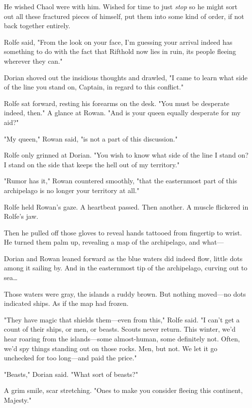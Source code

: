 He wished Chaol were with him. Wished for time to just 
\emph{stop} so he might sort out all these fractured pieces of himself, put them into some kind of order, if not back together entirely.

Rolfe said, "From the look on your face, I'm guessing your arrival indeed has something to do with the fact that Rifthold now lies in ruin, its people fleeing wherever they can."

Dorian shoved out the insidious thoughts and drawled, "I came to learn what side of the line you stand on, Captain, in regard to this conflict."

Rolfe sat forward, resting his forearms on the desk. "You must be desperate indeed, then." A glance at Rowan. "And is your queen equally desperate for my aid?"

"My queen," Rowan said, "is not a part of this discussion."

Rolfe only grinned at Dorian. "You wish to know what side of the line I stand on? I stand on the side that keeps the hell out of my territory."

"Rumor has it," Rowan countered smoothly, "that the easternmost part of this archipelago is no longer your territory at all."

Rolfe held Rowan's gaze. A heartbeat passed. Then another. A muscle flickered in Rolfe's jaw.

Then he pulled off those gloves to reveal hands tattooed from fingertip to wrist. He turned them palm up, revealing a map of the archipelago, and what---

Dorian and Rowan leaned forward as the blue waters did indeed flow, little dots among it sailing by. And in the easternmost tip of the archipelago, curving out to sea\ldots{}

Those waters were gray, the islands a ruddy brown. But nothing moved---no dots indicated ships. As if the map had frozen.

"They have magic that shields them---even from this," Rolfe said. "I can't get a count of their ships, or men, or beasts. Scouts never return. This winter, we'd hear roaring from the islands---some almost-human, some definitely not. Often, we'd spy  things standing out on those rocks. Men, but not. We let it go unchecked for too long---and paid the price."

"Beasts," Dorian said. "What sort of beasts?"

A grim smile, scar stretching. "Ones to make you consider fleeing this continent, Majesty."

